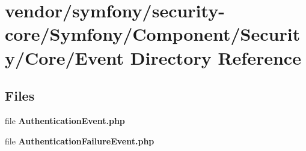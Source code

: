 \section{vendor/symfony/security-\/core/\+Symfony/\+Component/\+Security/\+Core/\+Event Directory Reference}
\label{dir_a38308bf2d05534812e468e175522684}
\subsection*{Files}
\begin{DoxyCompactItemize}
\item 
file {\bf Authentication\+Event.\+php}
\item 
file {\bf Authentication\+Failure\+Event.\+php}
\end{DoxyCompactItemize}
